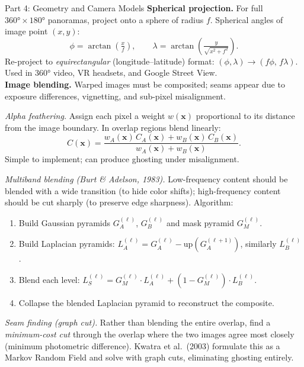 \documentclass[letterpaper]{article}
\begin{document}
\begin{notes}{Part 4: Geometry and Camera Models}
\textbf{Spherical projection.} For full $360°\times180°$ panoramas, project onto a sphere of radius $f$. Spherical angles of image point $(x,y)$:
$$\phi = \arctan\!\left(\tfrac{x}{f}\right), \qquad \lambda = \arctan\!\left(\tfrac{y}{\sqrt{x^2+f^2}}\right).$$
Re-project to \emph{equirectangular} (longitude--latitude) format: $(\phi,\lambda)\to(f\phi,\,f\lambda)$. Used in 360° video, VR headsets, and Google Street View.\\

\textbf{Image blending.} Warped images must be composited; seams appear due to exposure differences, vignetting, and sub-pixel misalignment.

\textit{Alpha feathering.} Assign each pixel a weight $w(\mathbf{x})$ proportional to its distance from the image boundary. In overlap regions blend linearly:
$$C(\mathbf{x}) = \frac{w_A(\mathbf{x})\,C_A(\mathbf{x}) + w_B(\mathbf{x})\,C_B(\mathbf{x})}{w_A(\mathbf{x}) + w_B(\mathbf{x})}.$$
Simple to implement; can produce ghosting under misalignment.

\textit{Multiband blending (Burt \& Adelson, 1983).} Low-frequency content should be blended with a wide transition (to hide color shifts); high-frequency content should be cut sharply (to preserve edge sharpness). Algorithm:
\begin{enumerate}
    \item Build Gaussian pyramids $G_A^{(\ell)}$, $G_B^{(\ell)}$ and mask pyramid $G_M^{(\ell)}$.
    \item Build Laplacian pyramids: $L_A^{(\ell)} = G_A^{(\ell)} - \mathrm{up}(G_A^{(\ell+1)})$, similarly $L_B^{(\ell)}$.
    \item Blend each level: $L_S^{(\ell)} = G_M^{(\ell)}\cdot L_A^{(\ell)} + (1-G_M^{(\ell)})\cdot L_B^{(\ell)}$.
    \item Collapse the blended Laplacian pyramid to reconstruct the composite.
\end{enumerate}

\textit{Seam finding (graph cut).} Rather than blending the entire overlap, find a \emph{minimum-cost cut} through the overlap where the two images agree most closely (minimum photometric difference). Kwatra et al.\ (2003) formulate this as a Markov Random Field and solve with graph cuts, eliminating ghosting entirely.\\


\end{notes}
\end{document}
